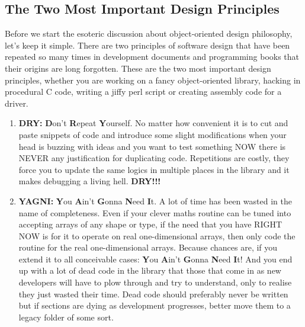 \documentclass[a4paper,11pt]{article}
\begin{document}
\subsection{The Two Most Important Design Principles}
Before we start the esoteric discussion about object-oriented design philosophy, let's keep it simple. There are two principles of software design that have been repeated so many times in development documents and programming books that their origins are long forgotten. These are the two most important design principles, whether you are working on a fancy object-oriented library, hacking in procedural C code, writing a jiffy perl script or creating assembly code for a driver.
\begin{enumerate}
\item \textbf{DRY:} \textbf{D}on't \textbf{R}epeat \textbf{Y}ourself. No matter how convenient it is to cut and paste snippets of code and introduce some slight modifications when your head is buzzing with ideas and you want to test something NOW there is NEVER any justification for duplicating code. Repetitions are costly, they force you to update the same logics in multiple places in the library and it makes debugging a living hell. \textbf{DRY!!!}
\item \textbf{YAGNI:} \textbf{Y}ou \textbf{A}in't \textbf{G}onna \textbf{N}eed \textbf{I}t. A lot of time has been wasted in the name of completeness. Even if your clever maths routine can be tuned into accepting arrays of any shape or type, if the need that you have RIGHT NOW is for it to operate on real one-dimensional arrays, then only code the routine for the real one-dimensional arrays. Because chances are, if you extend it to all conceivable cases: \textbf{Y}ou \textbf{A}in't \textbf{G}onna \textbf{N}eed \textbf{I}t! And you end up with a lot of dead code in the library that those that come in as new developers will have to plow through and try to understand, only to realise they just wasted their time. Dead code should preferably never be written but if sections are dying as development progresses, better move them to a legacy folder of some sort.
\end{enumerate}
\end{document}
